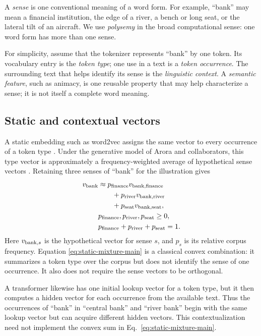 \documentclass[
  aps,
  reprint,
  superscriptaddress,
  floatfix,
  nofootinbib,
  longbibliography
]{revtex4-2}
\begin{document}
A \emph{sense} is one conventional meaning of a word form.  For example,
``bank'' may mean a financial institution, the edge of a river, a bench or
long seat, or the lateral tilt of an aircraft.  We use \emph{polysemy} in the
broad computational sense: one word form has more than one sense.

For simplicity, assume that the tokenizer represents ``bank'' by one token.
Its vocabulary entry is the \emph{token type}; one use in a text is a
\emph{token occurrence}.  The surrounding text that helps identify its sense
is the \emph{linguistic context}.  A \emph{semantic feature}, such as animacy,
is one reusable property that may help characterize a sense; it is not itself
a complete word meaning.

\subsection{Static and contextual vectors}

A static embedding such as word2vec assigns the same vector to every
occurrence of a token type \cite{mikolov2013}.  Under the generative model of
Arora and collaborators, this type vector is approximately a
frequency-weighted average of hypothetical sense vectors
\cite{arora-etal-2018-linear}.  Retaining three senses of ``bank'' for the
illustration gives
\begin{equation}
\begin{aligned}
 v_{\rm bank}
 &\approx p_{\rm finance}v_{{\rm bank},{\rm finance}} \\
 &\qquad+p_{\rm river}v_{{\rm bank},{\rm river}}\\
 &\qquad+p_{\rm seat}v_{{\rm bank},{\rm seat}},\\
 &p_{\rm finance},p_{\rm river},p_{\rm seat}\geq 0,\\
 &p_{\rm finance}+p_{\rm river}+p_{\rm seat}=1 .
\end{aligned}
 \label{eq:static-mixture-main}
\end{equation}
Here $v_{{\rm bank},s}$ is the hypothetical vector for sense $s$, and $p_s$
is its relative corpus frequency.  Equation
\eqref{eq:static-mixture-main} is a classical convex combination: it
summarizes a token type over the corpus but does not identify the sense of one
occurrence.  It also does not require the sense vectors to be orthogonal.

A transformer likewise has one initial lookup vector for a token type, but it
then computes a hidden vector for each occurrence from the available text.
Thus the occurrences of ``bank'' in ``central bank'' and ``river bank'' begin
with the same lookup vector but can acquire different hidden vectors.  This
contextualization need not implement the convex sum in
Eq.~\eqref{eq:static-mixture-main}.
\end{document}
